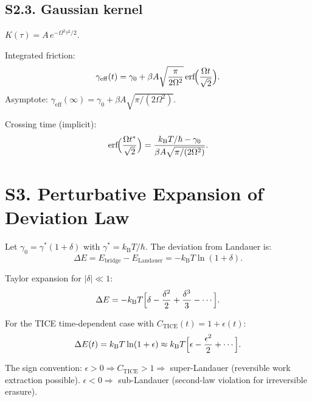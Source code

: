 \documentclass[twocolumn,showpacs,preprintnumbers,amsmath,amssymb]{revtex4-2}
\newcommand{\kB}{k_{\mathrm{B}}}
\newcommand{\geff}{\gamma_{\mathrm{eff}}}
\newcommand{\Ebr}{E_{\mathrm{bridge}}}
\newcommand{\EL}{E_{\mathrm{Landauer}}}
\newcommand{\CTICE}{C_{\mathrm{TICE}}}
\begin{document}
\subsection{S2.3. Gaussian kernel}

$K(\tau) = A\,e^{-\Omega^2\tau^2/2}$.

Integrated friction:
\begin{equation}
  \geff(t) = \gamma_0 + \beta A\sqrt{\frac{\pi}{2\Omega^2}}
  \,\mathrm{erf}\!\Bigl(\frac{\Omega t}{\sqrt{2}}\Bigr) .
\end{equation}
Asymptote:
$\geff(\infty) = \gamma_0 + \beta A\sqrt{\pi/(2\Omega^2)}$.

Crossing time (implicit):
\begin{equation}
  \mathrm{erf}\!\Bigl(\frac{\Omega t^*}{\sqrt{2}}\Bigr)
  = \frac{\kB T/\hbar - \gamma_0}
  {\beta A\sqrt{\pi/(2\Omega^2)}} .
  \label{eq:tstar_gauss}
\end{equation}

\section{S3. Perturbative Expansion of Deviation Law}
\label{sec:perturbation}

Let $\gamma_0 = \gamma^*(1 + \delta)$ with
$\gamma^* = \kB T/\hbar$.  The deviation from Landauer is:
\begin{equation}
  \Delta E = \Ebr - \EL = -\kB T\ln(1+\delta) .
  \label{eq:dev_exact}
\end{equation}

Taylor expansion for $|\delta| \ll 1$:
\begin{equation}
  \Delta E = -\kB T \Bigl[\delta
  - \frac{\delta^2}{2}
  + \frac{\delta^3}{3} - \cdots\Bigr] .
  \label{eq:dev_taylor}
\end{equation}

For the TICE time-dependent case with $\CTICE(t) = 1 + \epsilon(t)$:
\begin{equation}
  \Delta E(t) = \kB T\ln(1+\epsilon)
  \approx \kB T\Bigl[\epsilon
  - \frac{\epsilon^2}{2} + \cdots\Bigr] .
  \label{eq:dev_TICE}
\end{equation}

The sign convention: $\epsilon > 0 \Rightarrow \CTICE > 1 \Rightarrow$
super-Landauer (reversible work extraction possible).
$\epsilon < 0 \Rightarrow$ sub-Landauer (second-law violation for
irreversible erasure).
\end{document}
